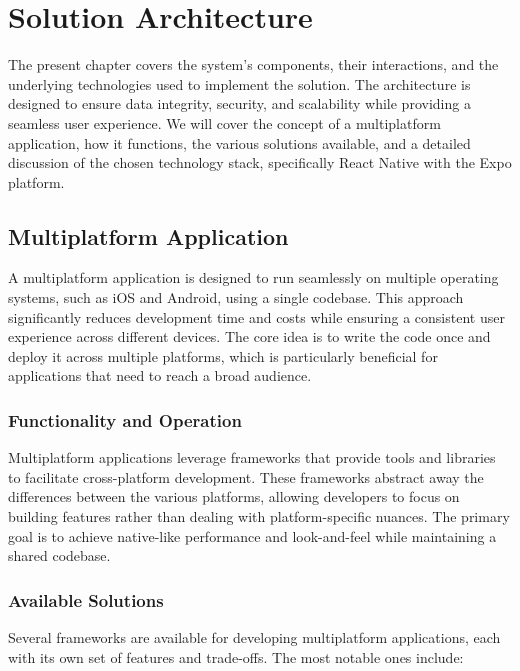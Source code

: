 %
%
\chapter{Solution Architecture}\label{chap:architecture}

The present chapter covers the system's components, their interactions, and the underlying technologies used to implement the solution. The architecture is designed to ensure data integrity, security, and scalability while providing a seamless user experience. We will cover the concept of a multiplatform application, how it functions, the various solutions available, and a detailed discussion of the chosen technology stack, specifically React Native with the Expo platform.

\section{Multiplatform Application}\label{sec:multiplatform-application}

A multiplatform application is designed to run seamlessly on multiple operating systems, such as iOS and Android, using a single codebase. This approach significantly reduces development time and costs while ensuring a consistent user experience across different devices. The core idea is to write the code once and deploy it across multiple platforms, which is particularly beneficial for applications that need to reach a broad audience.

\subsection{Functionality and Operation}

Multiplatform applications leverage frameworks that provide tools and libraries to facilitate cross-platform development. These frameworks abstract away the differences between the various platforms, allowing developers to focus on building features rather than dealing with platform-specific nuances. The primary goal is to achieve native-like performance and look-and-feel while maintaining a shared codebase.

\subsection{Available Solutions}

Several frameworks are available for developing multiplatform applications, each with its own set of features and trade-offs. The most notable ones include:

